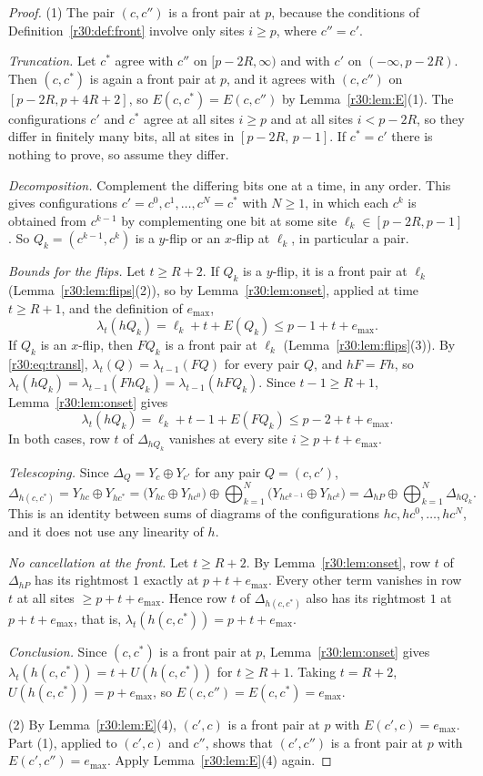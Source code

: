 \begin{proof}
(1) The pair $(c,c'')$ is a front pair at $p$, because the conditions of Definition~\ref{r30:def:front} involve only sites $i\ge p$, where $c''=c'$.

\emph{Truncation.} Let $c^*$ agree with $c''$ on $[p-2R,\infty)$ and with $c'$ on $(-\infty,p-2R)$. Then $(c,c^*)$ is again a front pair at $p$, and it agrees with $(c,c'')$ on $[p-2R,p+4R+2]$, so $E(c,c^*)=E(c,c'')$ by Lemma~\ref{r30:lem:E}(1). The configurations $c'$ and $c^*$ agree at all sites $i\ge p$ and at all sites $i<p-2R$, so they differ in finitely many bits, all at sites in $[p-2R,\,p-1]$. If $c^*=c'$ there is nothing to prove, so assume they differ.

\emph{Decomposition.} Complement the differing bits one at a time, in any order. This gives configurations $c'=c^0,c^1,\dots,c^N=c^*$ with $N\ge1$, in which each $c^k$ is obtained from $c^{k-1}$ by complementing one bit at some site $\ell_k\in[p-2R,p-1]$. So $Q_k=(c^{k-1},c^k)$ is a $y$-flip or an $x$-flip at $\ell_k$, in particular a pair.

\emph{Bounds for the flips.} Let $t\ge R+2$. If $Q_k$ is a $y$-flip, it is a front pair at $\ell_k$ (Lemma~\ref{r30:lem:flips}(2)), so by Lemma~\ref{r30:lem:onset}, applied at time $t\ge R+1$, and the definition of $e_{\max}$,
\[
\lambda_t(hQ_k)=\ell_k+t+E(Q_k)\le p-1+t+e_{\max}.
\]
If $Q_k$ is an $x$-flip, then $FQ_k$ is a front pair at $\ell_k$ (Lemma~\ref{r30:lem:flips}(3)). By \eqref{r30:eq:transl}, $\lambda_t(Q)=\lambda_{t-1}(FQ)$ for every pair $Q$, and $hF=Fh$, so $\lambda_t(hQ_k)=\lambda_{t-1}(FhQ_k)=\lambda_{t-1}(hFQ_k)$. Since $t-1\ge R+1$, Lemma~\ref{r30:lem:onset} gives
\[
\lambda_t(hQ_k)=\ell_k+t-1+E(FQ_k)\le p-2+t+e_{\max}.
\]
In both cases, row $t$ of $\Delta_{hQ_k}$ vanishes at every site $i\ge p+t+e_{\max}$.

\emph{Telescoping.} Since $\Delta_Q=Y_c\oplus Y_{c'}$ for any pair $Q=(c,c')$,
\[
\Delta_{h(c,c^*)}=Y_{hc}\oplus Y_{hc^*}=\bigl(Y_{hc}\oplus Y_{hc^0}\bigr)\oplus\bigoplus_{k=1}^N\bigl(Y_{hc^{k-1}}\oplus Y_{hc^k}\bigr)=\Delta_{hP}\oplus\bigoplus_{k=1}^N\Delta_{hQ_k}.
\]
This is an identity between sums of diagrams of the configurations $hc,hc^0,\dots,hc^N$, and it does not use any linearity of $h$.

\emph{No cancellation at the front.} Let $t\ge R+2$. By Lemma~\ref{r30:lem:onset}, row $t$ of $\Delta_{hP}$ has its rightmost $1$ exactly at $p+t+e_{\max}$. Every other term vanishes in row $t$ at all sites $\ge p+t+e_{\max}$. Hence row $t$ of $\Delta_{h(c,c^*)}$ also has its rightmost $1$ at $p+t+e_{\max}$, that is, $\lambda_t(h(c,c^*))=p+t+e_{\max}$.

\emph{Conclusion.} Since $(c,c^*)$ is a front pair at $p$, Lemma~\ref{r30:lem:onset} gives $\lambda_t(h(c,c^*))=t+U(h(c,c^*))$ for $t\ge R+1$. Taking $t=R+2$, $U(h(c,c^*))=p+e_{\max}$, so $E(c,c'')=E(c,c^*)=e_{\max}$.

(2) By Lemma~\ref{r30:lem:E}(4), $(c',c)$ is a front pair at $p$ with $E(c',c)=e_{\max}$. Part (1), applied to $(c',c)$ and $c''$, shows that $(c',c'')$ is a front pair at $p$ with $E(c',c'')=e_{\max}$. Apply Lemma~\ref{r30:lem:E}(4) again.
\end{proof}

